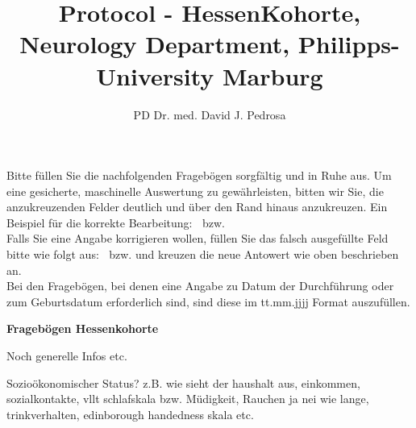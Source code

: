 \documentclass[
  english,
  ]{sdapsclassic}
\author{PD Dr. med. David J. Pedrosa}
\title{Protocol - HessenKohorte, Neurology Department, Philipps-University Marburg}
\begin{document}
\begin{questionnaire}[noinfo] %
\begin{Form}
\begin{info}
Bitte füllen Sie die nachfolgenden Fragebögen sorgfältig und in Ruhe aus. Um eine gesicherte, maschinelle Auswertung zu gewährleisten, bitten wir Sie, die anzukreuzenden Felder deutlich und über den Rand hinaus anzukreuzen. Ein Beispiel für die korrekte Bearbeitung: \checkedbox{} $~$ bzw. \checkedbox*{} \\ Falls Sie eine Angabe korrigieren wollen, füllen Sie das falsch ausgefüllte Feld bitte wie folgt aus: \correctedbox{}$~$ bzw. \correctedbox*{} und kreuzen die neue Antowert wie oben beschrieben an.\\
Bei den Fragebögen, bei denen eine Angabe zu Datum der Durchführung oder zum Geburtsdatum erforderlich sind, sind diese im tt.mm.jjjj Format auszufüllen. 
\end{info}
\vspace{1cm}

\begin{Large}
\textbf{Fragebögen Hessenkohorte}
\end{Large}
\vspace{1cm}
\begin{choicequestion}[cols=3]{}
\end{choicequestion}

Noch generelle Infos etc.

Sozioökonomischer Status? z.B. wie sieht der haushalt aus, einkommen, sozialkontakte, vllt schlafskala bzw. Müdigkeit, Rauchen ja nei wie lange, trinkverhalten, edinborough handedness skala  etc.


\newpage

\newpage

\newpage

\newpage

\newpage

\newpage

\newpage

\newpage

\newpage

\newpage

\newpage

\newpage

\newpage



\end{Form}
\end{questionnaire}
\end{document}
